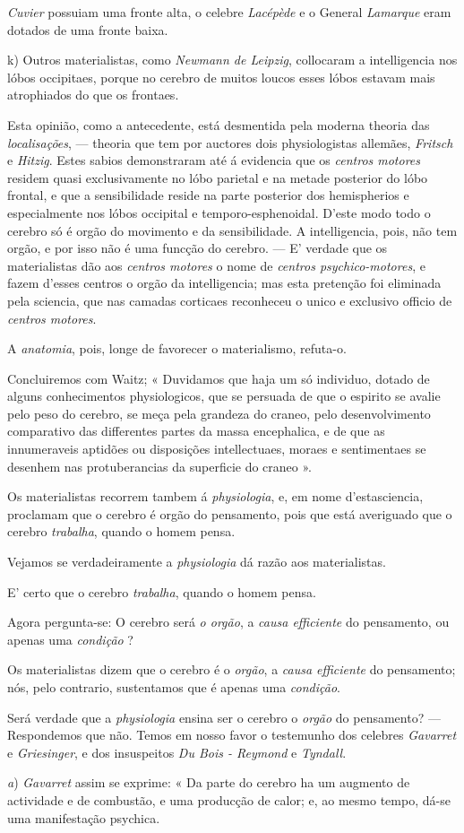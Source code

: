 \emph{Cuvier} possuiam uma fronte alta, o celebre \emph{Lacépède} e o General \emph{Lamarque} eram dotados de uma fronte baixa.\par k) Outros materialistas, como \emph{Newmann de Leipzig}, collocaram a intelligencia nos lóbos occipitaes, porque no cerebro de muitos loucos esses lóbos estavam mais atrophiados do que os frontaes.\par Esta opinião, como a antecedente, está desmentida pela moderna theoria das \emph{localisações}, --- theoria que tem por auctores dois physiologistas allemães, \emph{Fritsch} e \emph{Hitzig}. Estes sabios demonstraram até á evidencia que os \emph{centros motores} residem quasi exclusivamente no lóbo parietal e na metade posterior do lóbo frontal, e que a sensibilidade reside na parte posterior dos hemispherios e especialmente nos lóbos occipital e temporo-esphenoidal. D'este modo todo o cerebro só é orgão do movimento e da sensibilidade. A intelligencia, pois, não tem orgão, e por isso não é uma funcção do cerebro. --- E' verdade que os materialistas dão aos \emph{centros motores} o nome de \emph{centros psychico-motores}, e fazem d'esses centros o orgão da intelligencia; mas esta pretenção foi eliminada pela sciencia, que nas camadas corticaes reconheceu o unico e exclusivo officio de \emph{centros motores}.\par A \emph{anatomia}, pois, longe de favorecer o materialismo, refuta-o.\par Concluiremos com Waitz; « Duvidamos que haja um só individuo, dotado de alguns conhecimentos physiologicos, que se persuada de que o espirito se avalie pelo peso do cerebro, se meça pela grandeza do craneo, pelo desenvolvimento comparativo das differentes partes da massa encephalica, e de que as innumeraveis aptidões ou disposições intellectuaes, moraes e sentimentaes se desenhem nas protuberancias da superficie do craneo ».\par Os materialistas recorrem tambem á \emph{physiologia}, e, em nome d'estasciencia, proclamam que o cerebro é orgão do pensamento, pois que está averiguado que o cerebro \emph{trabalha}, quando o homem pensa.\par Vejamos se verdadeiramente a \emph{physiologia} dá razão aos materialistas.\par E' certo que o cerebro \emph{trabalha}, quando o homem pensa.\par Agora pergunta-se: O cerebro será \emph{o orgão}, a \emph{causa efficiente} do pensamento, ou apenas uma \emph{condição} ?\par Os materialistas dizem que o cerebro é o \emph{orgão}, a \emph{causa efficiente} do pensamento; nós, pelo contrario, sustentamos que é apenas uma \emph{condição}.\par Será verdade que a \emph{physiologia} ensina ser o cerebro o \emph{orgão} do pensamento? --- Respondemos que não. Temos em nosso favor o testemunho dos celebres \emph{Gavarret} e \emph{Griesinger}, e dos insuspeitos \emph{Du Bois - Reymond} e \emph{Tyndall}.\par \emph{a}) \emph{Gavarret} assim se exprime: « Da parte do cerebro ha um augmento de actividade e de combustão, e uma producção de calor; e, ao mesmo tempo, dá-se uma manifestação psychica. 